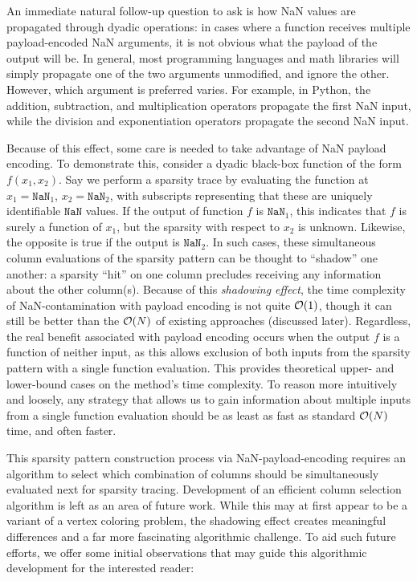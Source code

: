 An immediate natural follow-up question to ask is how NaN values are propagated through dyadic operations: in cases where a function receives multiple payload-encoded NaN arguments, it is not obvious what the payload of the output will be. In general, most programming languages and math libraries will simply propagate one of the two arguments unmodified, and ignore the other. However, which argument is preferred varies. For example, in Python, the addition, subtraction, and multiplication operators propagate the first NaN input, while the division and exponentiation operators propagate the second NaN input.

Because of this effect, some care is needed to take advantage of NaN payload encoding. To demonstrate this, consider a dyadic black-box function of the form $f(x_1, x_2)$. Say we perform a sparsity trace by evaluating the function at $x_1=\texttt{NaN}_1$, $x_2=\texttt{NaN}_2$, with subscripts representing that these are uniquely identifiable $\texttt{NaN}$ values. If the output of function $f$ is $\texttt{NaN}_1$, this indicates that $f$ is surely a function of $x_1$, but the sparsity with respect to $x_2$ is unknown. Likewise, the opposite is true if the output is $\texttt{NaN}_2$. In such cases, these simultaneous column evaluations of the sparsity pattern can be thought to ``shadow'' one another: a sparsity ``hit'' on one column precludes receiving any information about the other column(s). Because of this \emph{shadowing effect}, the time complexity of NaN-contamination with payload encoding is not quite $\mathcal{O}(1)$, though it can still be better than the $\mathcal{O}(N)$ of existing approaches (discussed later). Regardless, the real benefit associated with payload encoding occurs when the output $f$ is a function of neither input, as this allows exclusion of both inputs from the sparsity pattern with a single function evaluation. This provides theoretical upper- and lower-bound cases on the method's time complexity. To reason more intuitively and loosely, any strategy that allows us to gain information about multiple inputs from a single function evaluation should be as least as fast as standard $\mathcal{O}(N)$ time, and often faster.

This sparsity pattern construction process via NaN-payload-encoding requires an algorithm to select which combination of columns should be simultaneously evaluated next for sparsity tracing. Development of an efficient column selection algorithm is left as an area of future work. While this may at first appear to be a variant of a vertex coloring problem, the shadowing effect creates meaningful differences and a far more fascinating algorithmic challenge. To aid such future efforts, we offer some initial observations that may guide this algorithmic development for the interested reader:

